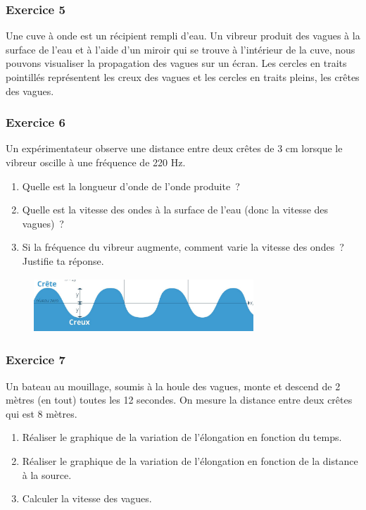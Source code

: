 \begin{multicols}{2}
\subsubsection*{Exercice 5}

  Une cuve à onde est un récipient rempli d'eau. Un vibreur produit des
  vagues à la surface de l'eau et à l'aide d'un miroir qui se trouve à
  l'intérieur de la cuve, nous pouvons visualiser la propagation des
  vagues sur un écran. Les cercles en traits pointillés représentent les
  creux des vagues et les cercles en traits pleins, les crêtes des
  vagues.

\subsubsection*{Exercice 6}

Un expérimentateur observe une distance entre deux crêtes de 3 cm
lorsque le vibreur oscille à une fréquence de 220 Hz.
\begin{enumerate}
\item  Quelle est la longueur d'onde de l'onde produite~?
\item   Quelle est la vitesse des ondes à la surface de l'eau (donc la vitesse
  des vagues)~?
\item  Si la fréquence du vibreur augmente, comment varie la vitesse des
  ondes~? Justifie ta réponse.
\end{enumerate}

\begin{figure}
\centering
\includegraphics[width=8.255cm,height=2.046cm]{Pictures/10000001000003F1000000EBCBD13793EBF001E8.png}
\caption{}
\end{figure}

\subsubsection*{Exercice 7}

  Un bateau au mouillage, soumis à la houle des vagues, monte et descend
  de 2 mètres (en tout) toutes les 12 secondes. On mesure la distance
  entre deux crêtes qui est 8 mètres.

\begin{enumerate}
\item  Réaliser le graphique de la variation de l'élongation en fonction du
  temps.
\item  Réaliser le graphique de la variation de l'élongation en fonction de
  la distance à la source.
\item  Calculer la vitesse des vagues.
\end{enumerate}


\end{multicols}

